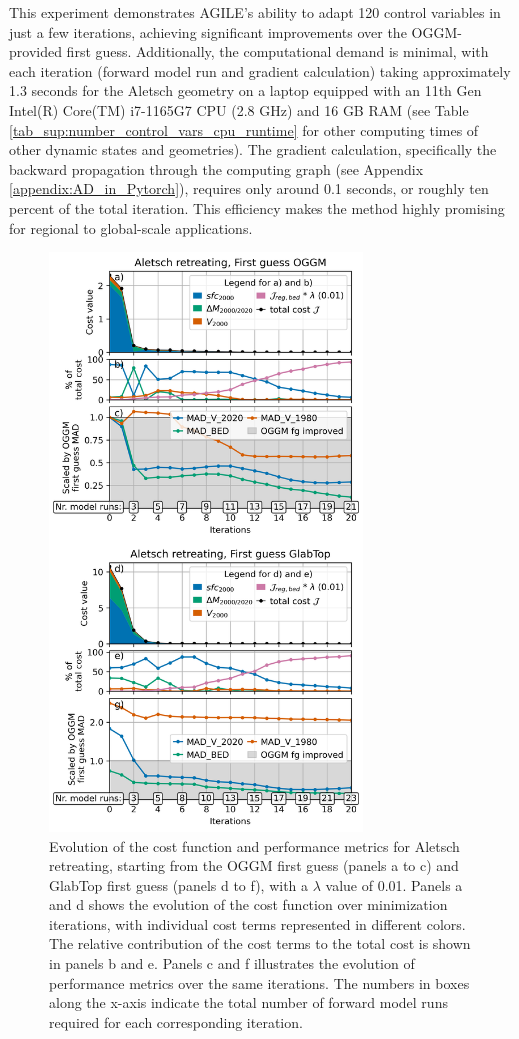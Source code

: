 \documentclass[journal abbreviation, manuscript]{copernicus}
\begin{document}
This experiment demonstrates AGILE’s ability to adapt 120 control variables in just a few iterations, achieving significant improvements over the OGGM-provided first guess. Additionally, the computational demand is minimal, with each iteration (forward model run and gradient calculation) taking approximately 1.3 seconds for the Aletsch geometry on a laptop equipped with an 11th Gen Intel(R) Core(TM) i7-1165G7 CPU (2.8 GHz) and 16 GB RAM (see Table \ref{tab_sup:number_control_vars_cpu_runtime} for other computing times of other dynamic states and geometries). The gradient calculation, specifically the backward propagation through the computing graph (see Appendix \ref{appendix:AD_in_Pytorch}), requires only around 0.1 seconds, or roughly ten percent of the total iteration. This efficiency makes the method highly promising for regional to global-scale applications.

\begin{figure}
    \centering
    \includegraphics[width=8.3cm]{fig04.png}
    \caption{Evolution of the cost function and performance metrics for Aletsch retreating, starting from the OGGM first guess (panels a to c) and GlabTop first guess (panels d to f), with a $\lambda$ value of 0.01. Panels a and d shows the evolution of the cost function over minimization iterations, with individual cost terms represented in different colors. The relative contribution of the cost terms to the total cost is shown in panels b and e. Panels c and f illustrates the evolution of performance metrics over the same iterations. The numbers in boxes along the x-axis indicate the total number of forward model runs required for each corresponding iteration.}
    \label{fig:aletsch_retreating_fg_oggm_and_fg_glabtop_cost_stats}
\end{figure}
\end{document}
